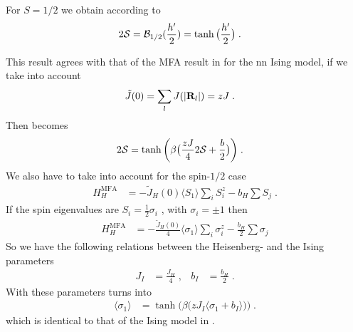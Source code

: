 For $S=1/2$ we obtain according to  
\begin{align}\label{eq:heisenberg:mfa:orderparameter}
2{\cal S} &={\cal B}_{1/2}(\frac{h'}{2}) = \tanh\big(\frac{h'}{2}\big)\;.
\end{align}
%

This result agrees with that of the MFA result in  for the nn Ising model, if we take into account 
%
\begin{align*}
\tilde J(0) &= \sum_{l}J(\abs{\mathbf R_{l}}) = z J \;.
\end{align*}
%
Then  becomes
%
\begin{align}\label{eq:hb:mfa:oderparameter}
2 {\cal S} &= \tanh\bigg( \beta\big( \frac{z J}{4} {2 \cal S}  +  \frac{b}{2}\big) \bigg)\;.
\end{align}
%
We also have to take into account for the spin-$1/2$ case
%
\begin{align*}
H^\text{MFA}_{H} &= -\tilde J_{H}(0) \langle S_{1} \rangle \sum_{i} S_{i}^{z} - b_{H}   \sum S_{j}\;.
\end{align*}
%
If the spin eigenvalues are  $S_{i}=\frac{1}{2} \sigma_{i}$ , with $\sigma_{i}=\pm 1$ then
\begin{align*}
H^\text{MFA}_{H} &= -\frac{\tilde J_{H}(0)}{4}  \langle \sigma_{1} \rangle\sum_{i} \sigma_{i}^{z} - \frac{b_{H}}{2}   \sum \sigma_{j}
\end{align*}
So we have the following relations between the Heisenberg- and the Ising parameters
%
\begin{align*}
J_{I} &= \frac{J_{H}}{4}\;, &b_{I} &= \frac{b_{H}}{2}\;.
\end{align*}
%
With these parameters  turns into
%
\begin{align*}
\langle \sigma_{1} \rangle &= \tanh\bigg( \beta\big( zJ_{I} \langle \sigma_{1}+b_{I} \rangle \big) \bigg)\;.
\end{align*}
%
which is identical to that of the Ising model in .

